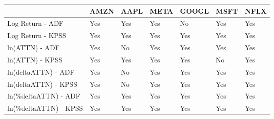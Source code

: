 \begin{tabular}{lllllll}
\toprule
{} & AMZN & AAPL & META & GOOGL & MSFT & NFLX \\
\midrule
Log Return - ADF      &  Yes &  Yes &  Yes &    No &  Yes &  Yes \\
Log Return - KPSS     &  Yes &  Yes &  Yes &   Yes &  Yes &  Yes \\
ln(ATTN) - ADF        &  Yes &   No &  Yes &   Yes &  Yes &  Yes \\
ln(ATTN) - KPSS       &  Yes &  Yes &  Yes &   Yes &   No &  Yes \\
ln(deltaATTN) - ADF   &  Yes &   No &  Yes &   Yes &  Yes &  Yes \\
ln(deltaATTN) - KPSS  &  Yes &   No &  Yes &   Yes &  Yes &  Yes \\
ln(\%deltaATTN) - ADF  &  Yes &  Yes &  Yes &   Yes &  Yes &  Yes \\
ln(\%deltaATTN) - KPSS &  Yes &  Yes &  Yes &   Yes &  Yes &  Yes \\
\bottomrule
\end{tabular}
